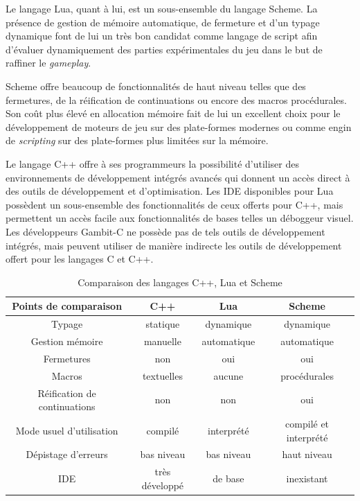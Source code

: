 \documentclass[12pt,twoside,letterpaper,francais]{book}
\newcommand{\customizedTableName}{\textsc{Tableau}}
\begin{document}
Le langage Lua, quant à lui, est un sous-ensemble du langage
Scheme. La présence de gestion de mémoire automatique, de fermeture et
d'un typage dynamique font de lui un très bon candidat comme langage
de script afin d'évaluer dynamiquement des parties expérimentales du
jeu dans le but de raffiner le \textit{gameplay}.

Scheme offre beaucoup de fonctionnalités de haut niveau telles que des
fermetures, de la réification de continuations ou encore des macros
procédurales. Son coût plus élevé en allocation mémoire fait de lui un
excellent choix pour le dévelop\-pement de moteurs de jeu sur des
plate-formes modernes ou comme engin de \textit{scripting} sur des
plate-formes plus limitées sur la mémoire.

Le langage C++ offre à ses programmeurs la possibilité d'utiliser des
environnements de développement intégrés avancés qui donnent un accès
direct à des outils de développement et d'optimisation. Les IDE
disponibles pour Lua possèdent un sous-ensemble des fonctionnalités de
ceux offerts pour C++, mais permettent un accès facile aux
fonctionnalités de bases telles un déboggeur visuel. Les développeurs
Gambit-C ne possède pas de tels outils de développement intégrés, mais
peuvent utiliser de manière indirecte les outils de développement
offert pour les langages C et C++.

\renewcommand{\tablename}{\customizedTableName}
\begin{table}
  \begin{tabular}{cccc}
    Points de comparaison         & C++ & Lua & Scheme\\
    \hline \hline
    Typage                       & statique & dynamique & dynamique\\
    Gestion mémoire              & manuelle & automatique & automatique\\
    Fermetures                   & non & oui & oui\\
    Macros                       & textuelles & aucune & procédurales\\
    Réification de continuations & non & non & oui\\
    Mode usuel d'utilisation     & compilé & interprété & compilé et interprété\\
    Dépistage d'erreurs          & bas niveau & bas niveau & haut niveau\\
    IDE                          & très développé & de base & inexistant\\
\hline
  \end{tabular}
  \caption{Comparaison des langages C++, Lua et Scheme}
  \label{Rev:lang-comp}
\end{table}
\end{document}
